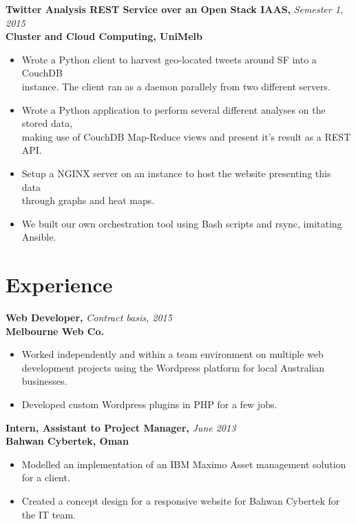 \documentclass[a4paper,overlapped]{res}
\begin{document}
\begin{resume}
  \textbf{Twitter Analysis REST Service over an Open Stack IAAS,} 
  \hfill \textit{Semester 1, 2015}\\
  \textbf{Cluster and Cloud Computing, UniMelb}
  \begin{itemize}
  \item Wrote a Python client to harvest geo-located tweets around SF into a
    CouchDB \\
    instance. The client ran as a daemon parallely from two different servers.
  \item Wrote a Python application to perform several different analyses on the
    stored data, \\
    making use of CouchDB Map-Reduce views and present it's result
    as a REST API.
  \item Setup a NGINX server on an instance to host the website presenting this
    data \\ through graphs and heat maps.
  \item We built our own orchestration tool using Bash scripts and rsync,
    imitating Ansible.
    
  \end{itemize}
  

  \section{Experience}

  \textbf{Web Developer,} \hfill \textit{Contract basis, 2015}\\
  \textbf{Melbourne Web Co.}
  \begin{itemize}
  \item Worked independently and within a team environment on multiple web 
    development projects using the Wordpress platform for local Australian businesses.
  \item Developed custom Wordpress plugins in PHP for a few jobs.  
  \end{itemize}
  
  \textbf{Intern, Assistant to Project Manager,}  \hfill \textit{June 2013}\\
  \textbf{Bahwan Cybertek, Oman}
  \begin{itemize}
  \item Modelled an implementation of an IBM Maximo Asset management 
    solution for a client. 
  \item Created a concept design for a responsive website for Bahwan Cybertek 
    for the IT team. 
  \end{itemize}


\end{resume}
\end{document}
